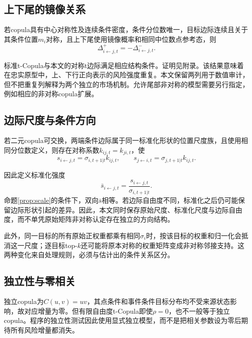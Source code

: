 \subsection{上下尾的镜像关系}
\begin{proposition}[对称设定的镜像性质]\label{prop:symmetry}
若copula具有中心对称性及连续条件密度，条件分位数唯一，目标边际连续且关于其条件位置$m_i$对称，且上下尾使用镜像概率和相同中位数点参考态，则
\begin{equation}\label{eq:symmetry}
\Delta^+_{i\leftarrow j,t}=-\Delta^-_{i\leftarrow j,t}.
\end{equation}
\end{proposition}
标准t-Copula与本文的对称t边际满足相应结构条件\cite{demarta2005}。证明见附录。该结果意味着在忠实原型中，上、下行正向表示的风险强度重复。本文保留两列用于数值审计，但不把重复列解释为两个独立的市场机制。允许尾部非对称的模型需要另行指定，例如相应的非对称copula扩展\cite{patton2006}。

\subsection{边际尺度与条件方向}
\begin{proposition}[同形边际的尺度分解]\label{prop:scale}
若二元copula可交换，两端条件边际属于同一标准化形状的位置尺度族，且使用相同分位数定义，则存在对称系数$k_{ij,t}=k_{ji,t}$，使
\begin{equation}\label{eq:scale_decomposition}
s_{i\leftarrow j,t}=\sigma_{i,t+1|t}k_{ij,t},\qquad
s_{j\leftarrow i,t}=\sigma_{j,t+1|t}k_{ij,t}.
\end{equation}
\end{proposition}
因此定义标准化强度
\begin{equation}\label{eq:standard_strength}
\bar s_{i\leftarrow j,t}=\frac{s_{i\leftarrow j,t}}{\sigma_{i,t+1|t}}.
\end{equation}
命题\ref{prop:scale}的条件下，双向$\bar s$相等。若边际自由度不同，标准化之后仍可能保留边际形状引起的差异。因此，本文同时保存原始尺度、标准化尺度与边际自由度，而不单凭原始矩阵非对称认定存在独立的方向结构。

此外，同一目标的所有原始正权重都乘有相同$\sigma_i$时，按该目标的权重和归一化会抵消这一尺度；逐目标top-$k$还可能将原本对称的权重矩阵变成非对称邻接支持。这两种变化来自处理规则，必须与估计出的条件关系区分。

\subsection{独立性与零相关}
独立copula为$C(u,v)=uv$，其点条件和事件条件目标分布均不受来源状态影响，故对应增量为零。但有限自由度t-Copula即使$\rho=0$，也不一般等于独立copula\cite{demarta2005}。程序的独立性测试因此使用显式独立模型，而不是把相关参数设为零后期待所有风险增量都消失。

